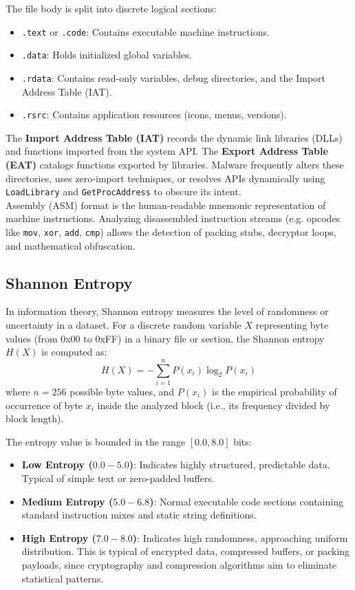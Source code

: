 \documentclass[11pt,a4paper]{article}
\begin{document}
The file body is split into discrete logical sections:
\begin{itemize}
    \item \texttt{.text} or \texttt{.code}: Contains executable machine instructions.
    \item \texttt{.data}: Holds initialized global variables.
    \item \texttt{.rdata}: Contains read-only variables, debug directories, and the Import Address Table (IAT).
    \item \texttt{.rsrc}: Contains application resources (icons, menus, versions).
\end{itemize}

The \textbf{Import Address Table (IAT)} records the dynamic link libraries (DLLs) and functions imported from the system API. The \textbf{Export Address Table (EAT)} catalogs functions exported by libraries. Malware frequently alters these directories, uses zero-import techniques, or resolves APIs dynamically using \texttt{LoadLibrary} and \texttt{GetProcAddress} to obscure its intent.\\

Assembly (ASM) format is the human-readable mnemonic representation of machine instructions. Analyzing disassembled instruction streams (e.g. opcodes like \texttt{mov}, \texttt{xor}, \texttt{add}, \texttt{cmp}) allows the detection of packing stubs, decryptor loops, and mathematical obfuscation.

\subsection{Shannon Entropy}
In information theory, Shannon entropy measures the level of randomness or uncertainty in a dataset. For a discrete random variable $X$ representing byte values (from 0x00 to 0xFF) in a binary file or section, the Shannon entropy $H(X)$ is computed as:
\begin{equation}
    H(X) = - \sum_{i=1}^{n} P(x_i) \log_2 P(x_i)
\end{equation}
where $n = 256$ possible byte values, and $P(x_i)$ is the empirical probability of occurrence of byte $x_i$ inside the analyzed block (i.e., its frequency divided by block length).

The entropy value is bounded in the range $[0.0, 8.0]$ bits:
\begin{itemize}
    \item \textbf{Low Entropy ($0.0 - 5.0$)}: Indicates highly structured, predictable data. Typical of simple text or zero-padded buffers.
    \item \textbf{Medium Entropy ($5.0 - 6.8$)}: Normal executable code sections containing standard instruction mixes and static string definitions.
    \item \textbf{High Entropy ($7.0 - 8.0$)}: Indicates high randomness, approaching uniform distribution. This is typical of encrypted data, compressed buffers, or packing payloads, since cryptography and compression algorithms aim to eliminate statistical patterns.
\end{itemize}
\end{document}
